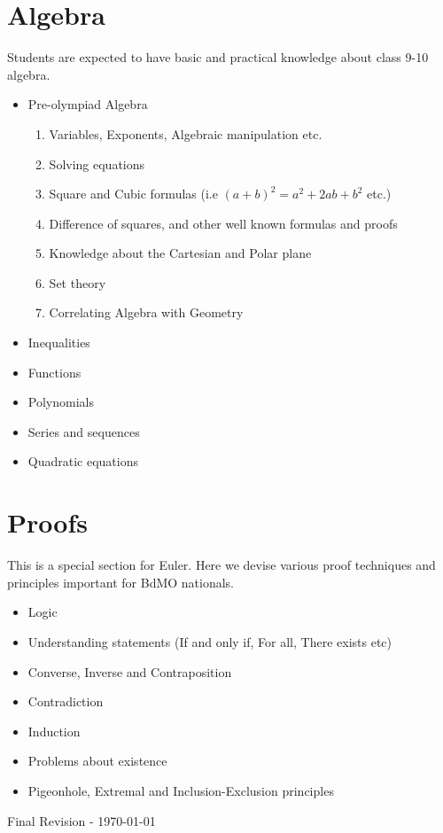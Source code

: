 \documentclass[oneside]{book}
\begin{document}
 \newpage
 
 \section{Algebra}
Students are expected to have basic and practical knowledge about class 9-10 algebra.
\begin{itemize}
    \item Pre-olympiad Algebra
        \begin{enumerate}
            \item Variables, Exponents, Algebraic manipulation etc.
            \item Solving equations
            \item Square and Cubic formulas (i.e $(a+b)^2 = a^2 + 2ab + b^2$ etc.)
            \item Difference of squares, and other well known formulas and proofs
            \item Knowledge about the Cartesian and Polar plane
            \item Set theory
            \item Correlating Algebra with Geometry
        \end{enumerate}
    \item Inequalities
    \item Functions
    \item Polynomials
    \item Series and sequences
    \item Quadratic equations
 \end{itemize}

 \section{Proofs}
 This is a special section for Euler. Here we devise various proof techniques and principles important for BdMO nationals.
 \begin{itemize}
     \item Logic
     \item Understanding statements (If and only if, For all, There exists etc)
     \item Converse, Inverse and Contraposition
     \item Contradiction
     \item Induction
     \item Problems about existence
     \item Pigeonhole, Extremal and Inclusion-Exclusion principles
 \end{itemize}
\vspace{25pt}
Final Revision - \today
\end{document}

